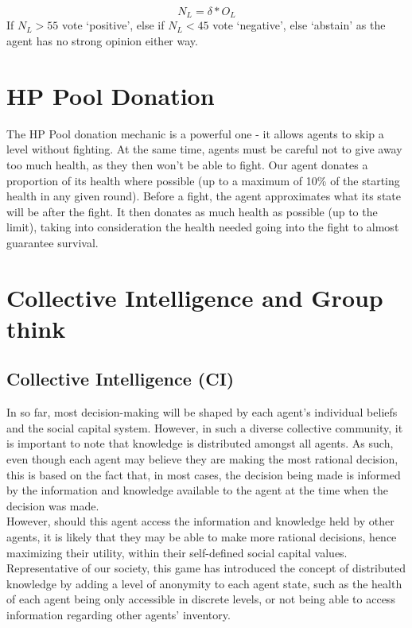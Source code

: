 \begin{equation}\label{eq:T6NoConfidenceValue}
    N_{L} = \delta * O_{L} 
\end{equation}
If $N_{L} > 55$ vote `positive', else if $N_L < 45$ vote `negative', else `abstain' as the agent has no strong opinion either way.

\section{HP Pool Donation}

The HP Pool donation mechanic is a powerful one - it allows agents to skip a level without fighting. At the same time, agents must be careful not to give away too much health, as they then won't be able to fight. Our agent donates a proportion of its health where possible (up to a maximum of 10\% of the starting health in any given round). Before a fight, the agent approximates what its state will be after the fight. It then donates as much health as possible (up to the limit), taking into consideration the health needed going into the fight to almost guarantee survival.

\section{Collective Intelligence and Group think}
\subsection{Collective Intelligence (CI)}
In so far, most decision-making will be shaped by each agent's individual beliefs and the social capital system. However, in such a diverse collective community, it is important to note that knowledge is distributed amongst all agents. As such, even though each agent may believe they are making the most rational decision, this is based on the fact that, in most cases, the decision being made is informed by the information and knowledge available to the agent at the time when the decision was made.\\

However, should this agent access the information and knowledge held by other agents, it is likely that they may be able to make more rational decisions, hence maximizing their utility, within their self-defined social capital values.\\

Representative of our society, this game has introduced the concept of distributed knowledge by adding a level of anonymity to each agent state, such as the health of each agent being only accessible in discrete levels, or not being able to access information regarding other agents' inventory.\\

